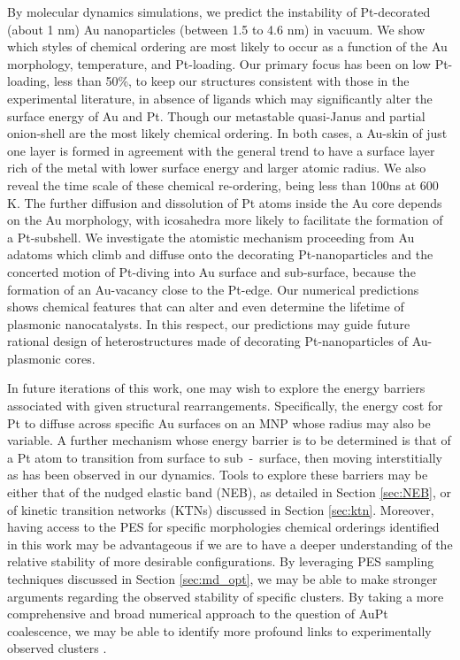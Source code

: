 %
By molecular dynamics simulations, we predict the instability of Pt-decorated (about 1 nm) Au nanoparticles (between 1.5 to 4.6 nm) in vacuum. We show which styles of chemical ordering are most likely to occur as a function of the Au morphology, temperature, and Pt-loading. Our primary focus has been on low Pt-loading, less than 50\%, to keep our structures consistent with those in the experimental literature, in absence of ligands which may significantly alter the surface energy of Au and Pt. Though our metastable quasi-Janus and partial onion-shell are the most likely chemical ordering. In both cases, a Au-skin of just one layer is formed in agreement with the general trend to have a surface layer rich of the metal with lower surface energy and larger atomic radius. We also reveal  the time scale of these chemical re-ordering, being less than 100ns at 600 K. The further diffusion and dissolution of Pt atoms inside the Au core depends on the Au morphology, with icosahedra more likely to facilitate the formation of a Pt-subshell. We investigate the atomistic  mechanism proceeding from Au adatoms which climb and diffuse onto the decorating Pt-nanoparticles and the concerted motion of Pt-diving into Au surface and sub-surface, because the formation of an Au-vacancy close to the Pt-edge. Our numerical predictions shows chemical features that can alter and even determine the lifetime of plasmonic nanocatalysts. In this respect, our predictions may guide future rational design of heterostructures made of decorating Pt-nanoparticles of Au-plasmonic cores.

In future iterations of this work, one may wish to explore the energy barriers associated with given structural rearrangements. Specifically, the energy cost for Pt to diffuse across specific Au surfaces on an MNP whose radius may also be variable. A further mechanism whose energy barrier is to be determined is that of a Pt atom to transition from surface to sub~-~surface, then moving interstitially as has been observed in our dynamics. Tools to explore these barriers may be either that of the nudged elastic band (NEB), as detailed in Section \ref{sec:NEB}, or of kinetic transition networks (KTNs) discussed in Section \ref{sec:ktn}. Moreover, having access to the PES for specific morphologies chemical orderings identified in this work may be advantageous if we are to have a deeper understanding of the relative stability of more desirable configurations. By leveraging PES sampling techniques discussed in Section \ref{sec:md_opt}, we may be able to make stronger arguments regarding the observed stability of specific clusters. By taking a more comprehensive and broad numerical approach to the question of AuPt coalescence, we may be able to identify more profound links to experimentally observed clusters \cite{JorgeStructure}.